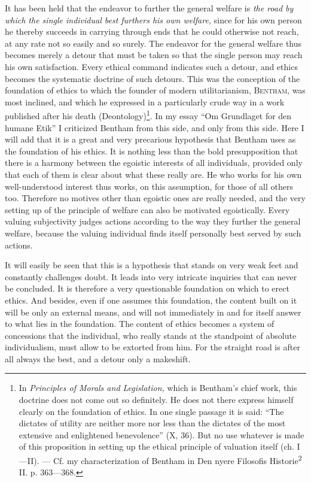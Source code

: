 \documentclass[12pt,a4paper,openany]{book}
\newcommand{\opage}[1]{\marginnote{\footnotesize\textit{[#1]}}}
\begin{document}
It has been held that the endeavor to further the general welfare is \textit{the road by which the
single individual best furthers his own welfare,} since for his own person he thereby succeeds in
carrying through ends that he could otherwise not reach, at any rate not so easily and so surely. The
endeavor for the general welfare thus becomes merely a detour that must be taken so that the single
person may reach his own satisfaction. Every ethical command indicates such a detour, and ethics
becomes the systematic doctrine of such detours. This was the conception of the foundation of ethics
to which the founder of modern utilitarianism, \textsc{Bentham}, was most inclined, and which he
expressed in a particularly crude way in a work published after his death
(Deontology)\footnote[1]{In \textit{Principles of Morals and Legislation,} which is Bentham's chief
work, this doctrine does not come out so definitely. He does not there express himself clearly on the
foundation of ethics. In one single passage it is said: ``The dictates of utility are neither more
nor less than the dictates of the most extensive and enlightened benevolence'' (X, 36). But no use
whatever is made of this proposition in setting up the ethical principle of valuation itself (ch.
I---II). --- Cf. my characterization of Bentham in Den nyere Filosofis Historie\textsuperscript{2} II.
p. 363---368.}. In my essay ``Om Grundlaget for
\opage{56}den humane Etik'' I criticized Bentham from this side, and only from this side. Here I will add
that it is a great and very precarious hypothesis that Bentham uses as the foundation of his ethics.
It is nothing less than the bold presupposition that there is a harmony between the egoistic interests
of all individuals, provided only that each of them is clear about what these really are. He who
works for his own well-understood interest thus works, on this assumption, for those of all others
too. Therefore no motives other than egoistic ones are really needed, and the very setting up of the
principle of welfare can also be motivated egoistically. Every valuing subjectivity judges actions
according to the way they further the general welfare, because the valuing individual finds itself
personally best served by such actions.

It will easily be seen that this is a hypothesis that stands on very weak feet and constantly
challenges doubt. It leads into very intricate inquiries that can never be concluded. It is therefore
a very questionable foundation on which to erect ethics. And besides, even if one assumes this
foundation, the content built on it will be only an external means, and will not immediately in and
for itself answer to what lies in the foundation. The content of ethics becomes a system of
concessions that the individual, who really stands at the standpoint of absolute individualism, must
allow to be extorted from him. For the straight road is after all always the best, and a detour only
a makeshift.
\end{document}
